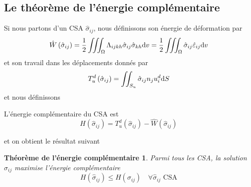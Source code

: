 \subsection{Le théorème de l'énergie complémentaire} \label{ssec:Ch09-1.3}
Si nous partons d'un CSA $\hat{\sigma}_{ij}$, nous définissons son énergie de déformation par
\begin{equation}
    \hat{W}\left( \hat{\sigma}_{ij} \right) = \frac{1}{2} \iiint_{\Omega} \Lambda_{ijkh} \hat{\sigma}_{ij} \hat{\sigma}_{kh} \mathrm{d} v = \frac{1}{2} \iiint_{\Omega} \hat{\sigma}_{ij} \hat{\varepsilon}_{ij} \mathrm{d} v
    \label{eq:Ch09-022}
\end{equation}
et son travail dans les déplacements donnés par 
\begin{equation}
    T_{u}^d \left( \hat{\sigma}_{ij} \right) = \iint_{S_u} \hat{\sigma}_{ij} n_j u_i^d \mathrm{d} S
    \label{eq:Ch09-023}
\end{equation}
et nous définissons 
\begin{defn}
    L'énergie complémentaire du CSA est
    \begin{equation}
        H \left( \hat{\sigma}_{ij} \right) = T_{u}^d \left( \hat{\sigma}_{ij} \right) - \hat{W}\left( \hat{\sigma}_{ij} \right)
        \label{eq:Ch09-024}
    \end{equation}
\end{defn}
et on obtient le résultat suivant 
\newtheorem*{ThECp}{Théorème de l'énergie complémentaire}
\begin{ThECp}
    Parmi tous les CSA, la solution $\sigma_{ij}$ maximise l'énergie complémentaire
    \begin{equation}
        H \left( \hat{\sigma}_{ij} \right) \leq H \left( \sigma_{ij} \right) \quad \forall \hat{\sigma}_{ij} \text{ CSA}
        \label{eq:Ch09-025}
    \end{equation}
\end{ThECp}
